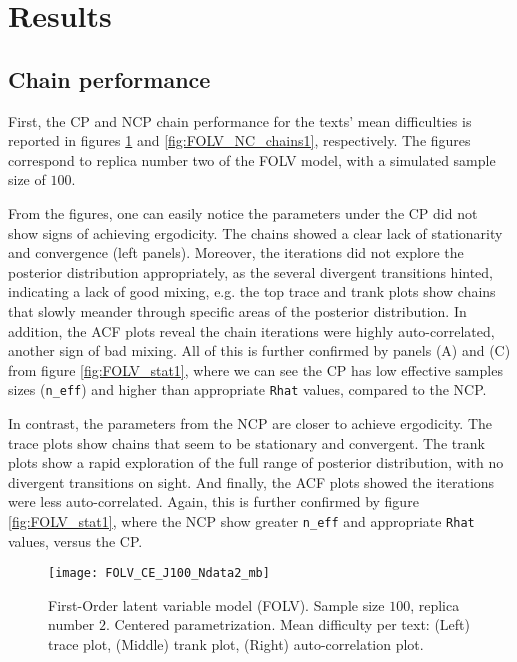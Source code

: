 
\section{Results}

\subsection{Chain performance}

First, the CP and NCP chain performance for the texts' mean difficulties is reported in figures \ref{fig:FOLV_CE_chains1} and \ref{fig:FOLV_NC_chains1}, respectively. The figures correspond to replica number two of the FOLV model, with a simulated sample size of $100$. 

From the figures, one can easily notice the parameters under the CP did not show signs of achieving ergodicity. The chains showed a clear lack of stationarity and convergence (left panels). Moreover, the iterations did not explore the posterior distribution appropriately, as the several divergent transitions hinted, indicating a lack of good mixing, e.g. the top trace and trank plots show chains that slowly meander through specific areas of the posterior distribution. In addition, the ACF plots reveal the chain iterations were highly auto-correlated, another sign of bad mixing. All of this is further confirmed by panels (A) and (C) from figure \ref{fig:FOLV_stat1}, where we can see the CP has low effective samples sizes (\texttt{n\_eff}) and higher than appropriate \texttt{Rhat} values, compared to the NCP.

In contrast, the parameters from the NCP are closer to achieve ergodicity. The trace plots show chains that seem to be stationary and convergent. The trank plots show a rapid exploration of the full range of posterior distribution, with no divergent transitions on sight. And finally, the ACF plots showed the iterations were less auto-correlated. Again, this is further confirmed by figure \ref{fig:FOLV_stat1}, where the NCP show greater \texttt{n\_eff} and appropriate \texttt{Rhat} values, versus the CP.
%
\begin{figure}[H]
	\centering
	\texttt{[image: FOLV\_CE\_J100\_Ndata2\_mb]}
	\caption[First-Order latent variable model (FOLV). Sample size $100$, replica number $2$. Centered parametrization. Mean difficulty per text. Trace, trank and auto-correlation plots.]%
	{First-Order latent variable model (FOLV). Sample size $100$, replica number $2$. Centered parametrization. Mean difficulty per text: (Left) trace plot, (Middle) trank plot, (Right) auto-correlation plot.}
	\label{fig:FOLV_CE_chains1}
\end{figure}

